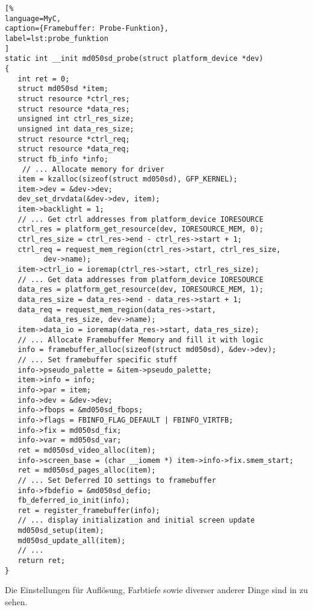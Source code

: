 \begin{lstlisting}[%
language=MyC,
caption={Framebuffer: Probe-Funktion},
label=lst:probe_funktion
]
static int __init md050sd_probe(struct platform_device *dev)
{
   int ret = 0;
   struct md050sd *item;
   struct resource *ctrl_res;
   struct resource *data_res;
   unsigned int ctrl_res_size;
   unsigned int data_res_size;
   struct resource *ctrl_req;
   struct resource *data_req;
   struct fb_info *info;
	// ... Allocate memory for driver
   item = kzalloc(sizeof(struct md050sd), GFP_KERNEL);
   item->dev = &dev->dev;
   dev_set_drvdata(&dev->dev, item);
   item->backlight = 1;
   // ... Get ctrl addresses from platform_device IORESOURCE
   ctrl_res = platform_get_resource(dev, IORESOURCE_MEM, 0);
   ctrl_res_size = ctrl_res->end - ctrl_res->start + 1;
   ctrl_req = request_mem_region(ctrl_res->start, ctrl_res_size,
         dev->name);
   item->ctrl_io = ioremap(ctrl_res->start, ctrl_res_size);
   // ... Get data addresses from platform_device IORESOURCE
   data_res = platform_get_resource(dev, IORESOURCE_MEM, 1);
   data_res_size = data_res->end - data_res->start + 1;
   data_req = request_mem_region(data_res->start,
         data_res_size, dev->name);
   item->data_io = ioremap(data_res->start, data_res_size);
   // ... Allocate Framebuffer Memory and fill it with logic
   info = framebuffer_alloc(sizeof(struct md050sd), &dev->dev);
   // ... Set framebuffer specific stuff
   info->pseudo_palette = &item->pseudo_palette;
   item->info = info;
   info->par = item;
   info->dev = &dev->dev;
   info->fbops = &md050sd_fbops;
   info->flags = FBINFO_FLAG_DEFAULT | FBINFO_VIRTFB;
   info->fix = md050sd_fix;
   info->var = md050sd_var;
   ret = md050sd_video_alloc(item);
   info->screen_base = (char __iomem *) item->info->fix.smem_start;
   ret = md050sd_pages_alloc(item);
   // ... Set Deferred IO settings to framebuffer
   info->fbdefio = &md050sd_defio;
   fb_deferred_io_init(info);
   ret = register_framebuffer(info);
   // ... display initialization and initial screen update
   md050sd_setup(item);
   md050sd_update_all(item);
   // ...
   return ret;
}
\end{lstlisting}
Die Einstellungen für Auflösung, Farbtiefe sowie diverser anderer Dinge sind in  zu sehen. 

